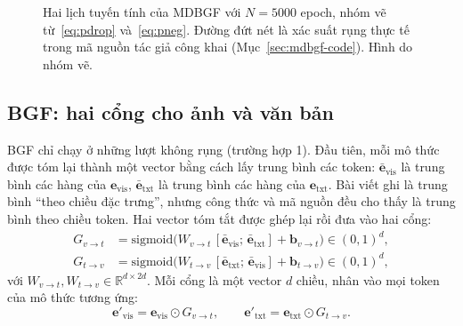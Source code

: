 \documentclass[conference,a4paper]{IEEEtran}
\begin{document}
\begin{figure}[t]
\centering
{}
\caption{Hai lịch tuyến tính của MDBGF với $N = 5000$ epoch, nhóm vẽ từ~\eqref{eq:pdrop} và~\eqref{eq:pneg}. Đường đứt nét là xác suất rụng thực tế trong mã nguồn tác giả công khai (Mục~\ref{sec:mdbgf-code}). Hình do nhóm vẽ.}
\label{fig:schedules}
\end{figure}

\subsection{BGF: hai cổng cho ảnh và văn bản}
\label{sec:mdbgf-bgf}

BGF chỉ chạy ở những lượt không rụng (trường hợp 1). Đầu tiên, mỗi mô thức được tóm lại thành một vector bằng cách lấy trung bình các token: $\bar{\mathbf{e}}_{\mathrm{vis}}$ là trung bình các hàng của $\mathbf{e}_{\mathrm{vis}}$, $\bar{\mathbf{e}}_{\mathrm{txt}}$ là trung bình các hàng của $\mathbf{e}_{\mathrm{txt}}$. Bài viết ghi là trung bình ``theo chiều đặc trưng'', nhưng công thức và mã nguồn đều cho thấy là trung bình theo chiều token. Hai vector tóm tắt được ghép lại rồi đưa vào hai cổng:
\begin{align}
G_{v\to t} &= \mathrm{sigmoid}\big(W_{v\to t}\,[\bar{\mathbf{e}}_{\mathrm{vis}};\,\bar{\mathbf{e}}_{\mathrm{txt}}] + \mathbf{b}_{v\to t}\big) \in (0,1)^d, \label{eq:gvt}\\
G_{t\to v} &= \mathrm{sigmoid}\big(W_{t\to v}\,[\bar{\mathbf{e}}_{\mathrm{txt}};\,\bar{\mathbf{e}}_{\mathrm{vis}}] + \mathbf{b}_{t\to v}\big) \in (0,1)^d, \label{eq:gtv}
\end{align}
với $W_{v\to t}, W_{t\to v} \in \mathbb{R}^{d \times 2d}$. Mỗi cổng là một vector $d$ chiều, nhân vào mọi token của mô thức tương ứng:
\begin{equation}
\mathbf{e}'_{\mathrm{vis}} = \mathbf{e}_{\mathrm{vis}} \odot G_{v\to t}, \qquad
\mathbf{e}'_{\mathrm{txt}} = \mathbf{e}_{\mathrm{txt}} \odot G_{t\to v}.
\label{eq:bgf}
\end{equation}
\end{document}
